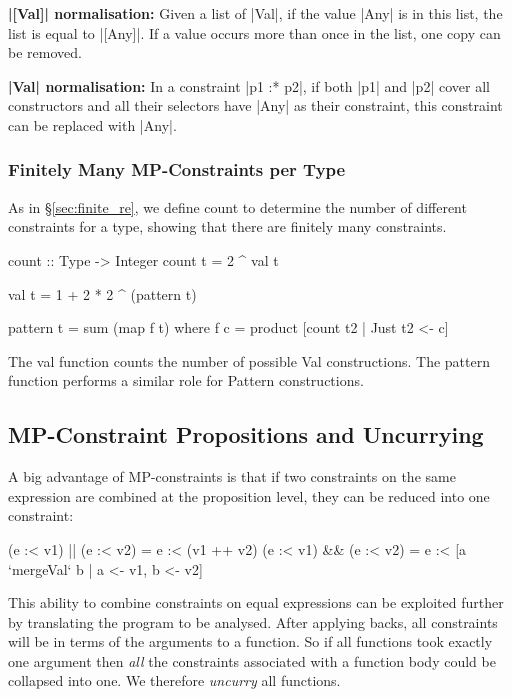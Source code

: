 \documentclass[preprint]{sigplanconf}
\newcommand{\C}[1]{\textsf{#1}}
\newcommand{\para}[1]{\vspace{2mm}\noindent\textbf{#1}}
\begin{document}
\para{|[Val]| normalisation:} Given a list of |Val|, if the value |Any| is in this list, the list is equal to |[Any]|. If a value occurs more than once in the list, one copy can be removed.

\para{|Val| normalisation:} In a constraint |p1 :* p2|, if both |p1| and |p2| cover all constructors and all their selectors have |Any| as their constraint, this constraint can be replaced with |Any|.


\subsubsection{Finitely Many MP-Constraints per Type}

As in \S\ref{sec:finite_re}, we define \C{count} to determine the number of different constraints for a type, showing that there are finitely many constraints.

\begin{code}
count :: Type -> Integer
count t = 2 ^ val t

val t = 1 + 2 * 2 ^ (pattern t)

pattern t = sum (map f t)
    where f c = product [count t2 | Just t2 <- c]
\end{code}

The \C{val} function counts the number of possible \C{Val} constructions. The \C{pattern} function performs a similar role for \C{Pattern} constructions.


\subsection{MP-Constraint Propositions and Uncurrying}

A big advantage of MP-constraints is that if two constraints on the same expression are combined at the proposition level, they can be reduced into one constraint:

\begin{code}
(e :< v1) || (e :< v2) = e :< (v1 ++ v2)
(e :< v1) && (e :< v2) = e :< [a `mergeVal` b | a <- v1, b <- v2]
\end{code}

\noindent This ability to combine constraints on equal expressions can be exploited further by translating the program to be analysed. After applying \C{backs}, all constraints will be in terms of the arguments to a function. So if all functions took exactly one argument then \textit{all} the constraints associated with a function body could be collapsed into one. We therefore \textit{uncurry} all functions.
\end{document}
